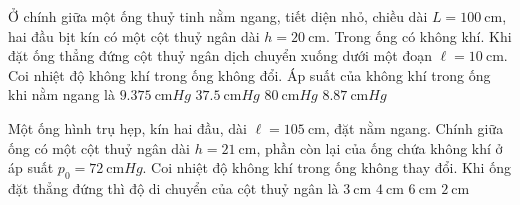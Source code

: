\begin{ex}
Ở chính giữa một ống thuỷ tinh nằm ngang, tiết diện nhỏ, chiều dài $L=\SI{100}{\centi\meter}$, hai đầu bịt kín có một cột thuỷ ngân dài $h=\SI{20}{\centi\meter}$. Trong ống có không khí. Khi đặt ống thẳng đứng cột thuỷ ngân dịch chuyển xuống dưới một đoạn $\ell=\SI{10}{\centi\meter}$. Coi nhiệt độ không khí trong ống không đổi. Áp suất của không khí trong ống khi nằm ngang là	
	\choice
	{$\SI{9.375}{\centi\meter Hg}$}
	{\True $\SI{37.5}{\centi\meter Hg}$}
	{$\SI{80}{\centi\meter Hg}$}
	{$\SI{8.87}{\centi\meter Hg}$}
\end{ex}
\begin{ex}
	Một ống hình trụ hẹp, kín hai đầu, dài $\ell=\SI{105}{\centi\meter}$, đặt nằm ngang. Chính giữa ống có một cột thuỷ ngân dài $h=\SI{21}{\centi\meter}$, phần còn lại của ống chứa không khí ở áp suất $p_0=\SI{72}{\centi\meter Hg}$. Coi nhiệt độ không khí trong ống không thay đổi. Khi ống đặt thẳng đứng thì độ di chuyển của cột thuỷ ngân là
	\choice
	{$\SI{3}{\centi\meter}$}
	{$\SI{4}{\centi\meter}$}
	{\True $\SI{6}{\centi\meter}$}
	{$\SI{2}{\centi\meter}$}
\end{ex}
